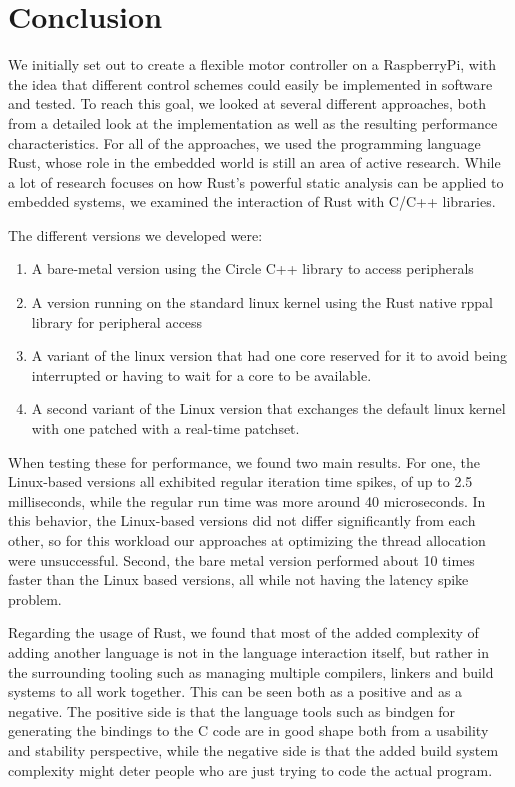 \chapter{Conclusion}
\label{chap:conclusion}

We initially set out to create a flexible motor controller on a RaspberryPi,
with the idea that different control schemes could easily be implemented in software and tested.
To reach this goal, we looked at several different approaches,
both from a detailed look at the implementation as well as the resulting performance characteristics.
For all of the approaches, we used the programming language Rust,
whose role in the embedded world is still an area of active research.
While a lot of research focuses on how Rust's powerful static analysis can be applied to embedded systems,
we examined the interaction of Rust with C/C++ libraries.

The different versions we developed were:
\begin{enumerate}
    \item A bare-metal version using the Circle C++ library to access peripherals
    \item A version running on the standard linux kernel using the Rust native rppal library for peripheral access
    \item A variant of the linux version that had one core reserved for it to avoid being interrupted or having to wait for a core to be available.
    \item A second variant of the Linux version that exchanges the default linux kernel with one patched with a real-time patchset.
\end{enumerate}

When testing these for performance, we found two main results.
For one, the Linux-based versions all exhibited regular iteration time spikes, of up to 2.5 milliseconds,
while the regular run time was more around 40 microseconds.
In this behavior, the Linux-based versions did not differ significantly from each other,
so for this workload our approaches at optimizing the thread allocation were unsuccessful.
Second, the bare metal version performed about 10 times faster than the Linux based versions,
all while not having the latency spike problem.

Regarding the usage of Rust, we found that most of the added complexity of adding another language is not in the language interaction itself,
but rather in the surrounding tooling such as managing multiple compilers, linkers and build systems to all work together.
This can be seen both as a positive and as a negative.
The positive side is that the language tools such as bindgen for generating the bindings to the C code are in good shape both from a usability and stability perspective,
while the negative side is that the added build system complexity might deter people who are just trying to code the actual program.

